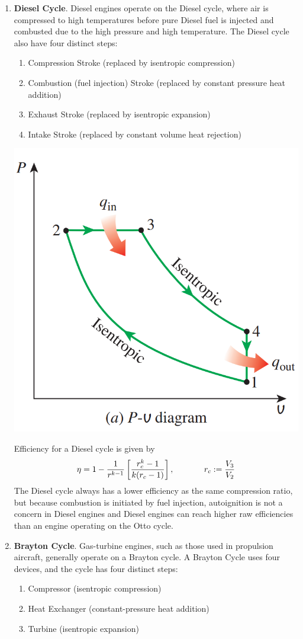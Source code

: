 \begin{enumerate}
    \item[] \textbf{Diesel Cycle}. Diesel engines operate on the Diesel cycle, where air is compressed to high temperatures before pure Diesel fuel is injected and combusted due to the high pressure and high temperature. The Diesel cycle also have four distinct steps:
    \begin{enumerate}
        \item Compression Stroke (replaced by isentropic compression)
        \item Combustion (fuel injection) Stroke (replaced by constant pressure heat addition)
        \item Exhaust Stroke (replaced by isentropic expansion)
        \item Intake Stroke (replaced by constant volume heat rejection)
    \end{enumerate}
    \begin{center}
        \includegraphics[width=0.4\linewidth]{Images/thermo diesel.png}
    \end{center}
    Efficiency for a Diesel cycle is given by \[\eta = 1-\frac{1}{r^{k-1}}\left[\frac{r_c^k - 1}{k(r_c-1)}\right],\hspace{0.5in}r_c:=\frac{V_3}{V_2}\]
    The Diesel cycle always has a lower efficiency as the same compression ratio, but because combustion is initiated by fuel injection, autoignition is not a concern in Diesel engines and Diesel engines can reach higher raw efficiencies than an engine operating on the Otto cycle.
    \item[] \textbf{Brayton Cycle}. Gas-turbine engines, such as those used in propulsion aircraft, generally operate on a Brayton cycle. A Brayton Cycle uses four devices, and the cycle has four distinct steps:
    \begin{enumerate}
        \item Compressor (isentropic compression)
        \item Heat Exchanger (constant-pressure heat addition)
        \item Turbine (isentropic expansion)

\end{enumerate}
\end{enumerate}
